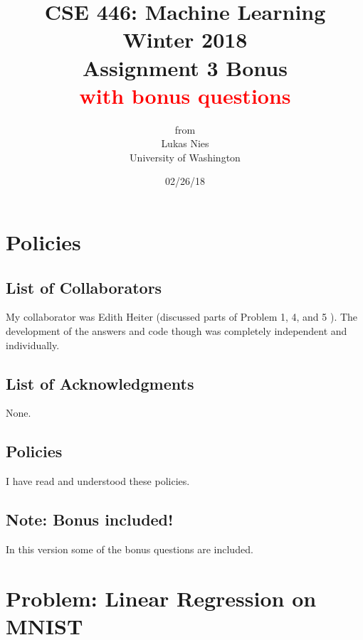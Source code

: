 \documentclass[12pt]{article}
\begin{document}
	
	\title{
		\textbf{\huge{CSE 446: Machine Learning Winter 2018 }} \\[2cm]
		\LARGE{Assignment 3 Bonus \\ \textcolor{red}{with bonus questions}}\\[1cm]
	}
	\author{from \\ Lukas Nies \\ University of Washington}
	\date{02/26/18}
	\clearpage\maketitle\thispagestyle{empty}
	\newpage

	\tableofcontents
	\setcounter{page}{0}
	\newpage
	
	\setcounter{section}{-1}
	

\section{Policies}

\subsection{List of Collaborators}

My collaborator was Edith Heiter (discussed parts of Problem 1, 4, and 5 ). The development of the answers and code though was completely independent and individually.

\subsection{List of Acknowledgments}

None.

\subsection{Policies}

I have read and understood these policies.

\subsection{Note: Bonus included!}

In this version some of the bonus questions are included.

\newpage

\section{Problem: Linear Regression on MNIST}
\end{document}
